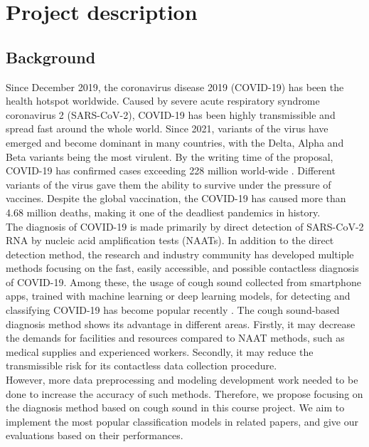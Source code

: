 \documentclass[11pt]{article}
\begin{document}
\section{Project description} %
\subsection{Background}
Since December 2019, the coronavirus disease 2019 (COVID-19) has been the health hotspot
worldwide. Caused by severe acute respiratory syndrome coronavirus 2 (SARS-CoV-2), COVID-19
 has been highly transmissible and spread fast around the whole world. Since 2021, variants
 of the virus have emerged and become dominant in many countries, with the Delta, Alpha and
 Beta variants being the most virulent. By the writing time of the proposal, COVID-19 has
  confirmed cases exceeding 228 million world-wide \cite{enwiki:1044966507}. Different variants of the virus gave
  them the ability to survive under the pressure of vaccines. Despite the global vaccination,
   the COVID-19 has caused more than  4.68 million deaths, making it one of the deadliest
   pandemics in history.\\

\noindent
The diagnosis of COVID-19 is made primarily by direct detection of SARS-CoV-2 RNA by nucleic acid amplification tests (NAATs). In addition to the direct detection method, the research and industry community has developed multiple methods focusing on the fast, easily accessible, and possible contactless diagnosis of COVID-19. Among these, the usage of cough sound collected from smartphone apps, trained with machine learning or deep learning models, for detecting and classifying COVID-19 has become popular recently \cite{PPR:PPR343330}. The cough sound-based
diagnosis method shows its advantage in different areas. Firstly, it may decrease the demands for facilities and resources compared to NAAT methods, such as medical supplies and experienced workers. Secondly, it may reduce the transmissible risk for its contactless data collection procedure. \\

\noindent
However, more data preprocessing and modeling development work needed to be done to increase the accuracy of such methods. Therefore, we propose focusing on the diagnosis method based on cough sound in this course project. We aim to implement the most popular classification
models in related papers, and give our evaluations based on their performances.
\end{document}
